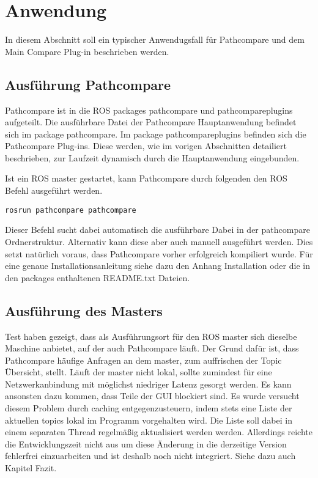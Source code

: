 \chapter{Anwendung}
\label{sec:andwendung}
In diesem Abschnitt soll ein typischer Anwendugsfall für Pathcompare und dem
Main Compare Plug-in beschrieben werden. 

\section{Ausführung Pathcompare}

Pathcompare ist in die ROS packages pathcompare und pathcompareplugins
aufgeteilt. Die ausführbare Datei der Pathcompare Hauptanwendung befindet sich
im package pathcompare. Im package pathcompareplugins befinden sich die
Pathcompare Plug-ins. Diese werden, wie im vorigen Abschnitten detailiert
beschrieben, zur Laufzeit dynamisch durch die Hauptanwendung eingebunden.

Ist ein ROS master gestartet, kann Pathcompare durch folgenden den ROS Befehl
ausgeführt werden.

\begin{lstlisting}[caption=starting pathcompare, label=lst:rosrun]
rosrun pathcompare pathcompare
\end{lstlisting}

Dieser Befehl sucht dabei automatisch die ausführbare Dabei in der pathcompare
Ordnerstruktur. Alternativ kann diese aber auch manuell ausgeführt werden.
Dies setzt natürlich voraus, dass Pathcompare vorher erfolgreich kompiliert
wurde. Für eine genaue Installationsanleitung siehe dazu den Anhang Installation
oder die in den packages enthaltenen README.txt Dateien.


\section{Ausführung des Masters}

Test haben gezeigt, dass als Ausführungsort für den ROS master sich dieselbe
Maschine anbietet, auf der auch Pathcompare läuft. Der Grund dafür ist, dass
Pathcompare häufige Anfragen an dem master, zum auffrischen der Topic
Übersicht, stellt. Läuft der master nicht lokal, sollte zumindest für eine
Netzwerkanbindung mit möglichst niedriger Latenz gesorgt werden. Es kann
ansonsten dazu kommen, dass Teile der GUI blockiert sind. Es wurde versucht
diesem Problem durch caching entgegenzusteuern, indem stets eine Liste der
aktuellen topics lokal im Programm vorgehalten wird. Die Liste soll dabei in einem
separaten Thread regelmäßig aktualisiert werden werden. Allerdings reichte die
Entwicklungszeit nicht aus um diese Änderung in die derzeitige Version
fehlerfrei einzuarbeiten und ist deshalb noch nicht integriert. Siehe dazu auch
Kapitel Fazit.


